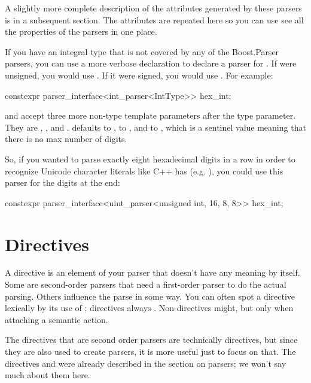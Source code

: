 \documentclass{MyBook}
\begin{document}
\begin{marker}[title=Note ]
A slightly more complete description of the attributes generated by these parsers is in a subsequent section. The attributes are repeated here so you can use see all the properties of the parsers in one place. 
\end{marker}

If you have an integral type  that is not covered by any of the Boost.Parser parsers, you can use a more verbose declaration to declare a parser for . If  were unsigned, you would use . If it were signed, you would use . For example:

\begin{code}
constexpr parser_interface<int_parser<IntType>> hex_int;
\end{code}

 and  accept three more non-type template parameters after the type parameter. They are , , and .  defaults to ,  to , and  to , which is a sentinel value meaning that there is no max number of digits.

So, if you wanted to parse exactly eight hexadecimal digits in a row in order to recognize Unicode character literals like C++ has (e.g. ), you could use this parser for the digits at the end:

\begin{code}
constexpr parser_interface<uint_parser<unsigned int, 16, 8, 8>> hex_int;
\end{code}

\section{Directives}

A directive is an element of your parser that doesn't have any meaning by itself. Some are second-order parsers that need a first-order parser to do the actual parsing. Others influence the parse in some way. You can often spot a directive lexically by its use of \ci{{[}{]}}; directives always \ci{{[}{]}}. Non-directives might, but only when attaching a semantic action.

The directives that are second order parsers are technically directives, but since they are also used to create parsers, it is more useful just to focus on that. The directives  and  were already described in the section on parsers; we won't say much about them here.
\end{document}
